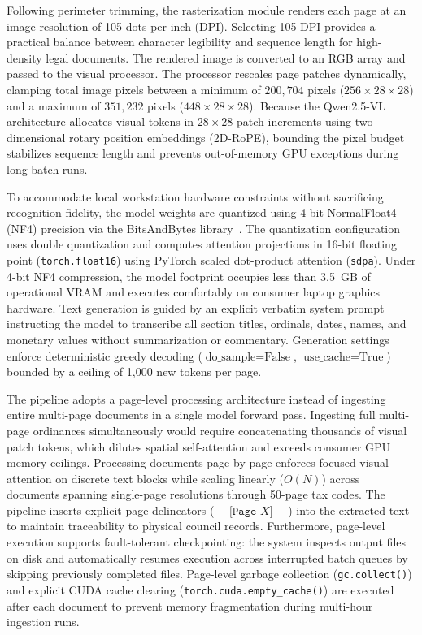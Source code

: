         Following perimeter trimming, the rasterization module renders each page at an image resolution of 105 dots per inch (DPI). Selecting 105 DPI provides a practical balance between character legibility and sequence length for high-density legal documents. The rendered image is converted to an RGB array and passed to the visual processor. The processor rescales page patches dynamically, clamping total image pixels between a minimum of $200{,}704$ pixels ($256 \times 28 \times 28$) and a maximum of $351{,}232$ pixels ($448 \times 28 \times 28$). Because the Qwen2.5-VL architecture allocates visual tokens in $28 \times 28$ patch increments using two-dimensional rotary position embeddings (2D-RoPE), bounding the pixel budget stabilizes sequence length and prevents out-of-memory GPU exceptions during long batch runs.

        To accommodate local workstation hardware constraints without sacrificing recognition fidelity, the model weights are quantized using 4-bit NormalFloat4 (NF4) precision via the BitsAndBytes library~\cite{dettmers2024qlora}. The quantization configuration uses double quantization and computes attention projections in 16-bit floating point (\texttt{torch.float16}) using PyTorch scaled dot-product attention (\texttt{sdpa}). Under 4-bit NF4 compression, the model footprint occupies less than 3.5~GB of operational VRAM and executes comfortably on consumer laptop graphics hardware. Text generation is guided by an explicit verbatim system prompt instructing the model to transcribe all section titles, ordinals, dates, names, and monetary values without summarization or commentary. Generation settings enforce deterministic greedy decoding ($\text{do\_sample} = \text{False}$, $\text{use\_cache} = \text{True}$) bounded by a ceiling of 1,000 new tokens per page.

        The pipeline adopts a page-level processing architecture instead of ingesting entire multi-page documents in a single model forward pass. Ingesting full multi-page ordinances simultaneously would require concatenating thousands of visual patch tokens, which dilutes spatial self-attention and exceeds consumer GPU memory ceilings. Processing documents page by page enforces focused visual attention on discrete text blocks while scaling linearly ($O(N)$) across documents spanning single-page resolutions through 50-page tax codes. The pipeline inserts explicit page delineators ($\texttt{--- [Page } X\texttt{] ---}$) into the extracted text to maintain traceability to physical council records. Furthermore, page-level execution supports fault-tolerant checkpointing: the system inspects output files on disk and automatically resumes execution across interrupted batch queues by skipping previously completed files. Page-level garbage collection (\texttt{gc.collect()}) and explicit CUDA cache clearing (\texttt{torch.cuda.empty\_cache()}) are executed after each document to prevent memory fragmentation during multi-hour ingestion runs.


